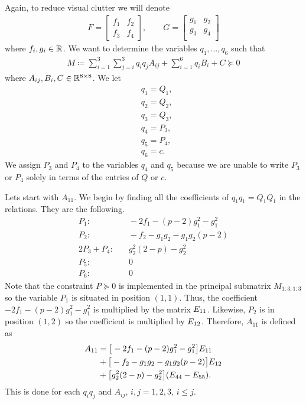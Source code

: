 \documentclass[a4paper,12pt,twoside,BCOR=10mm]{scrbook}
\begin{document}
Again, to reduce visual clutter we will denote
\begin{align*}
    F = \begin{bmatrix}
    f_1 & f_2\\
    f_3 & f_4
    \end{bmatrix}
    , \qquad
    G = \begin{bmatrix}
    g_1 & g_2\\
    g_3 & g_4\\
    \end{bmatrix}
\end{align*}
where $f_i,g_i \in \mathbb{R}^{}$. We want to determine the variables $q_1, \ldots, q_6$ such that
\begin{align}
    M \coloneqq \sum_{i = 1}^3\sum_{j = i}^3 q_i q_j A_{ij} + \sum_{i = 1}^6 q_i B_i + C \succeq 0
\end{align}
where $A_{ij}, B_i, C \in \mathbb{R}^{8\times 8}$. We let
\begin{align*}
    &q_1 = Q_1,\\
    &q_2 = Q_2,\\
    &q_3 = Q_3,\\
    &q_4 = P_3,\\
    &q_5 = P_4,\\
    &q_6 = c.
\end{align*}
We assign $P_3$ and $P_4$ to the variables $q_4$ and $q_5$ because we are unable to write $P_3$ or $P_4$ solely in terms of the entries of $Q$ or $c$.

Lets start with $A_{11}$. We begin by finding all the coefficients of $q_1q_1 = Q_1Q_1$ in the relations. They are the following.
\begin{align*}
    P_1:& \quad -2f_1 - (p - 2)g_1^2 - g_1^2\\
    P_2:& \quad -f_2 - g_1g_2 - g_1g_2(p - 2)\\
    2P_3 + P_4:& \quad g_2^2(2 - p) - g_2^2\\
    P_5:& \quad 0\\
    P_6:& \quad 0
\end{align*}
Note that the constraint $P \succeq 0$ is implemented in the principal submatrix $M_{1:3,1:3}$ so the variable $P_1$ is situated in position $(1,1)$. Thus, the coefficient $-2f_1 - (p - 2)g_1^2 - g_1^2$ is multiplied by the matrix $E_{11}$. Likewise, $P_2$ is in position $(1,2)$ so the coefficient is multiplied by $E_{12}$. Therefore, $A_{11}$ is defined as
\begin{align*}
    A_{11} &= \big[-2f_1 - (p - 2)g_1^2 - g_1^2\big]E_{11}\\
    \quad& + \big[-f_2 - g_1g_2 - g_1g_2(p - 2)\big]E_{12}\\
    \quad& + \big[g_2^2(2 - p) - g_2^2\big](E_{44} - E_{55}).
\end{align*}
This is done for each $q_iq_j$ and $A_{ij}$, $i,j = 1,2,3$, $i \leq j$.
\end{document}
